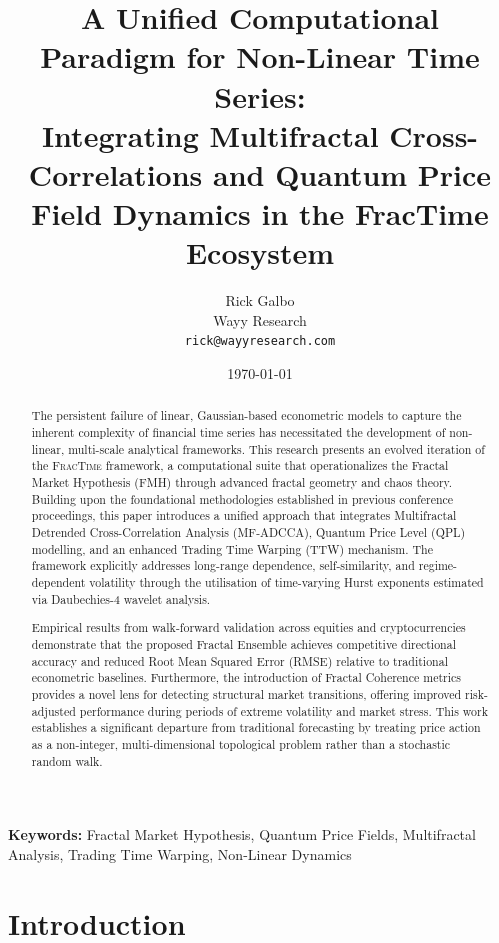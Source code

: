 \documentclass[12pt,a4paper]{article}
\title{%
  A Unified Computational Paradigm for Non-Linear Time Series:\\
  Integrating Multifractal Cross-Correlations and Quantum Price\\
  Field Dynamics in the FracTime Ecosystem%
}
\author{
  Rick Galbo\\
  Wayy Research\\
  \texttt{rick@wayyresearch.com}
}
\date{\today}
\begin{document}
\maketitle

\begin{abstract}
The persistent failure of linear, Gaussian-based econometric models to capture
the inherent complexity of financial time series has necessitated the
development of non-linear, multi-scale analytical frameworks.  This research
presents an evolved iteration of the \textsc{FracTime} framework, a
computational suite that operationalizes the Fractal Market Hypothesis (FMH)
through advanced fractal geometry and chaos theory.  Building upon the
foundational methodologies established in previous conference proceedings, this
paper introduces a unified approach that integrates Multifractal Detrended
Cross-Correlation Analysis (MF-ADCCA), Quantum Price Level (QPL) modelling,
and an enhanced Trading Time Warping (TTW) mechanism.  The framework
explicitly addresses long-range dependence, self-similarity, and
regime-dependent volatility through the utilisation of time-varying Hurst
exponents estimated via Daubechies-4 wavelet analysis.

Empirical results from walk-forward validation across equities and
cryptocurrencies demonstrate that the proposed Fractal Ensemble achieves
competitive directional accuracy and reduced Root Mean Squared Error (RMSE)
relative to traditional econometric baselines.  Furthermore, the introduction
of Fractal Coherence metrics provides a novel lens for detecting structural
market transitions, offering improved risk-adjusted performance during periods
of extreme volatility and market stress.  This work establishes a significant
departure from traditional forecasting by treating price action as a
non-integer, multi-dimensional topological problem rather than a stochastic
random walk.
\end{abstract}

\noindent\textbf{Keywords:} Fractal Market Hypothesis, Quantum Price Fields,
Multifractal Analysis, Trading Time Warping, Non-Linear Dynamics

\section{Introduction}
\label{sec:introduction}
\end{document}
